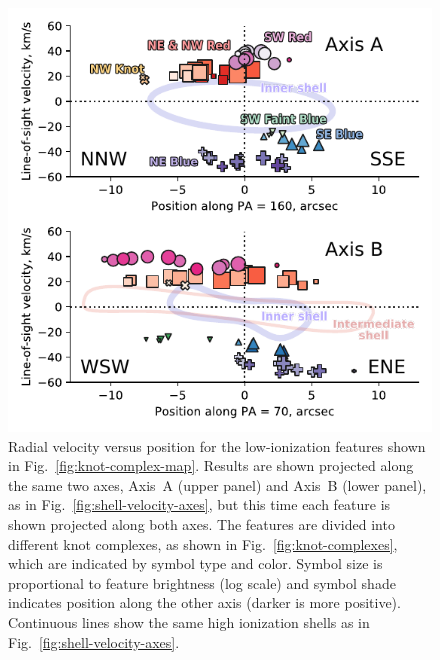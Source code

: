 \documentclass[useAMS, usenatbib]{mnras}
\begin{document}
\begin{figure}
  \centering
  \includegraphics[width=\linewidth]{figs/turtle-knot-complexes-velocity-axes-annotated}
  \caption{
    Radial velocity versus position
    for the low-ionization features shown in Fig.~\ref{fig:knot-complex-map}.
    Results are shown projected along the same two axes,
    Axis~A (upper panel) and Axis~B (lower panel),
    as in Fig.~\ref{fig:shell-velocity-axes},
    but this time each feature is shown projected along both axes.
    The features are divided into different knot complexes,
    as shown in Fig.~\ref{fig:knot-complexes},
    which are indicated by symbol type and color.
    Symbol size is proportional to feature brightness (log scale)
    and symbol shade indicates position along the other axis (darker is more positive).
    Continuous lines show the same high ionization shells
    as in Fig.~\ref{fig:shell-velocity-axes}.
  }
  \label{fig:knot-complex-velocity-axes}
\end{figure}
\end{document}
